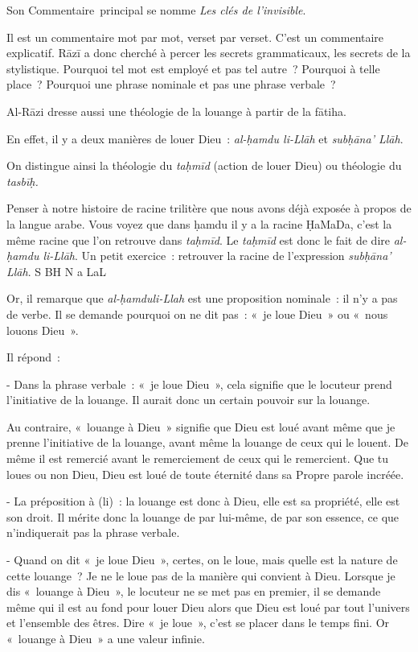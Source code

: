 Son Commentaire~principal se nomme \emph{Les clés de l'invisible}.

Il est un commentaire mot par mot, verset par verset. C'est un
commentaire explicatif. Rāzī a donc cherché à percer les secrets
grammaticaux, les secrets de la stylistique. Pourquoi tel mot est
employé et pas tel autre~? Pourquoi à telle place~? Pourquoi une phrase
nominale et pas une phrase verbale~?

Al-Rāzi dresse aussi une théologie de la louange à partir de la fātiha.

En effet, il y a deux manières de louer Dieu~: \emph{al-ḥamdu li-Llāh}
et \emph{subḥāna' Llāh}.

On distingue ainsi la théologie du \emph{taḥmīd} (action de louer Dieu)
ou théologie du \emph{tasbīḥ.}

Penser à notre histoire de racine trilitère  que nous avons déjà exposée
à propos de la langue arabe. Vous voyez que dans ḥamdu il y a la racine
ḤaMaDa, c'est la même racine que l'on retrouve dans \emph{taḥmīd}. Le
\emph{taḥmīd} est donc le fait de dire \emph{al-ḥamdu li-Llāh}. Un petit
exercice~: retrouver la racine de l'expression \emph{subḥāna' Llāh}. S
BH N a LaL

Or, il remarque que \emph{al-ḥamduli-Llah} est une proposition
nominale~: il n'y a pas de verbe. Il se demande pourquoi on ne dit pas~:
«~je loue Dieu~» ou «~nous louons Dieu~».

Il répond~:

- Dans la phrase verbale~: «~je loue Dieu~», cela signifie que le
locuteur prend l'initiative de la louange. Il aurait donc un certain
pouvoir sur la louange.

Au contraire, «~louange à Dieu~» signifie que Dieu est loué avant même
que je prenne l'initiative de la louange, avant même la louange de ceux
qui le louent. De même il est remercié avant le remerciement de ceux qui
le remercient. Que tu loues ou non Dieu, Dieu est loué de toute éternité
dans sa Propre parole incréée.

- La préposition à (li)~: la louange est donc à Dieu, elle est sa
propriété, elle est son droit. Il mérite donc la louange de par
lui-même, de par son essence, ce que n'indiquerait pas la phrase
verbale.

- Quand on dit «~je loue Dieu~», certes, on le loue, mais quelle est la
nature de cette louange~? Je ne le loue pas de la manière qui convient à
Dieu. Lorsque je dis «~louange à Dieu~», le locuteur ne se met pas en
premier, il se demande même qui il est au fond pour louer Dieu alors que
Dieu est loué par tout l'univers et l'ensemble des êtres. Dire «~je
loue~», c'est se placer dans le temps fini. Or «~louange à Dieu~» a une
valeur infinie.

